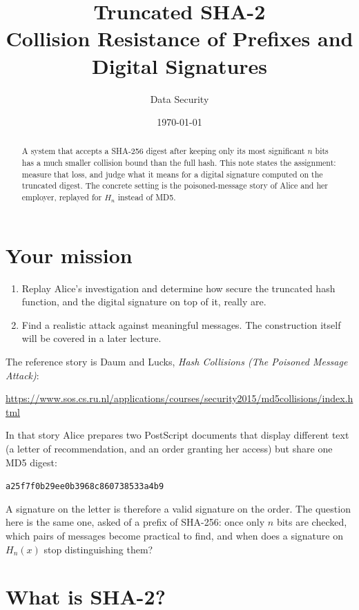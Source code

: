 \documentclass[11pt,a4paper]{article}
\title{%
  Truncated SHA-2\\[0.35em]
  \large Collision Resistance of Prefixes and Digital Signatures%
}
\author{Data Security}
\date{\today}
\newcommand{\Hn}{H_{n}}
\begin{document}
\maketitle
\thispagestyle{empty}

\begin{abstract}
\noindent
A system that accepts a SHA-256 digest after keeping only its most significant
\(n\) bits has a much smaller collision bound than the full hash.
This note states the assignment: measure that loss, and judge what it means
for a digital signature computed on the truncated digest.
The concrete setting is the poisoned-message story of Alice and her employer,
replayed for \(\Hn\) instead of MD5.
\end{abstract}

\section{Your mission}

\begin{enumerate}
  \item Replay Alice's investigation and determine how secure the truncated
        hash function, and the digital signature on top of it, really are.
  \item Find a realistic attack against meaningful messages.
        The construction itself will be covered in a later lecture.
\end{enumerate}

The reference story is Daum and Lucks,
\textit{Hash Collisions (The Poisoned Message Attack)}:
\begin{center}
\url{https://www.sos.cs.ru.nl/applications/courses/security2015/md5collisions/index.html}
\end{center}

In that story Alice prepares two PostScript documents that display different
text (a letter of recommendation, and an order granting her access) but share
one MD5 digest:
\begin{center}
\texttt{a25f7f0b29ee0b3968c860738533a4b9}
\end{center}
A signature on the letter is therefore a valid signature on the order.
The question here is the same one, asked of a prefix of SHA-256:
once only \(n\) bits are checked, which pairs of messages become practical to
find, and when does a signature on \(\Hn(x)\) stop distinguishing them?

\section{What is SHA-2?}
\end{document}
